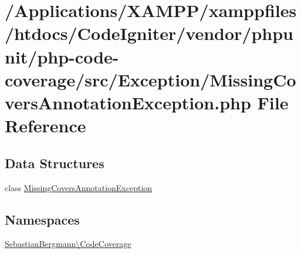 \hypertarget{php-code-coverage_2src_2_exception_2_missing_covers_annotation_exception_8php}{}\section{/\+Applications/\+X\+A\+M\+P\+P/xamppfiles/htdocs/\+Code\+Igniter/vendor/phpunit/php-\/code-\/coverage/src/\+Exception/\+Missing\+Covers\+Annotation\+Exception.php File Reference}
\label{php-code-coverage_2src_2_exception_2_missing_covers_annotation_exception_8php}
\subsection*{Data Structures}
\begin{DoxyCompactItemize}
\item 
class \mbox{\hyperlink{class_sebastian_bergmann_1_1_code_coverage_1_1_missing_covers_annotation_exception}{Missing\+Covers\+Annotation\+Exception}}
\end{DoxyCompactItemize}
\subsection*{Namespaces}
\begin{DoxyCompactItemize}
\item 
 \mbox{\hyperlink{namespace_sebastian_bergmann_1_1_code_coverage}{Sebastian\+Bergmann\textbackslash{}\+Code\+Coverage}}
\end{DoxyCompactItemize}
